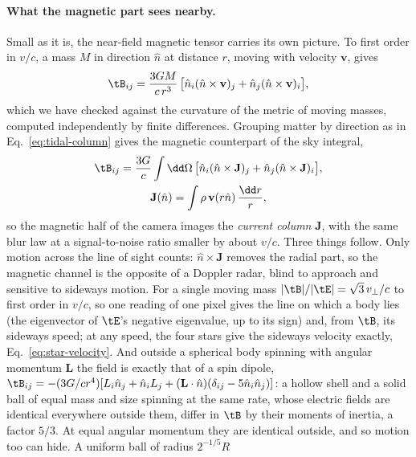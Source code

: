 \paragraph{What the magnetic part sees nearby.} Small as it is, the near-field
magnetic tensor carries its own picture. To first order in $v/c$, a mass $M$ in
direction $\hat n$ at distance $r$, moving with velocity $\mathbf{v}$, gives
\begin{equation}\label{eq:magnetic-point}
\tB_{ij} = \frac{3GM}{c\,r^{3}}\,\bigl[\hat n_i(\hat n\times\mathbf{v})_j
+ \hat n_j(\hat n\times\mathbf{v})_i\bigr],
\end{equation}
which we have checked against the curvature of the metric of moving masses,
computed independently by finite differences. Grouping matter by direction
as in Eq.~\eqref{eq:tidal-column} gives the magnetic counterpart of the sky
integral,
\begin{equation}\label{eq:current-column}
\begin{gathered}
\tB_{ij} = \frac{3G}{c}\int\dd\Omega\,\bigl[\hat n_i(\hat n\times\mathbf{J})_j
+ \hat n_j(\hat n\times\mathbf{J})_i\bigr],\\
\mathbf{J}(\hat n) = \int \rho\,\mathbf{v}(r\hat n)\,\frac{\dd r}{r} ,
\end{gathered}
\end{equation}
so the magnetic half of the camera images the \emph{current column}
$\mathbf{J}$, with the same blur law at a signal-to-noise ratio smaller by
about $v/c$. Three things follow. Only motion across the line of sight counts:
$\hat n\times\mathbf{J}$ removes the radial part, so the magnetic channel is
the opposite of a Doppler radar, blind to approach and sensitive to sideways
motion. For a single moving mass $|\tB|/|\tE| = \sqrt3\,v_\perp/c$ to first order
in $v/c$, so one reading of one pixel gives the line on which a body lies (the
eigenvector of $\tE$'s negative eigenvalue, up to its sign) and, from $\tB$, its
sideways speed; at any speed, the four stars give the sideways velocity
exactly, Eq.~\eqref{eq:star-velocity}. And outside a spherical body spinning with angular momentum
$\mathbf{L}$ the field is exactly that of a spin dipole,
$\tB_{ij} = -(3G/cr^{4})[L_i\hat n_j + \hat n_iL_j
+ (\mathbf{L}\cdot\hat n)(\delta_{ij} - 5\hat n_i\hat n_j)]$: a hollow shell and
a solid ball of equal mass and size spinning at the same rate, whose electric
fields are identical everywhere outside them, differ in $\tB$ by their moments
of inertia, a factor $5/3$. At equal angular momentum they are identical
outside, and so motion too can hide. A uniform ball of radius $2^{-1/5}R$

